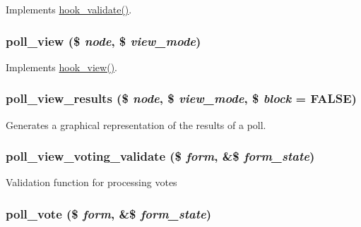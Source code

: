 \label{poll_8module_a42c8123c32a91678ef00d3f09be16a3e}
Implements \hyperlink{group__node__api__hooks_gacaf7cff104c642c28f76ce7ec5f33f40}{hook\_\-validate()}. \hypertarget{poll_8module_a00b8e97faf78018321120f381270c90a}{
\subsubsection[{poll\_\-view}]{\setlength{\rightskip}{0pt plus 5cm}poll\_\-view (\$ {\em node}, \/  \$ {\em view\_\-mode})}}
\label{poll_8module_a00b8e97faf78018321120f381270c90a}
Implements \hyperlink{group__node__api__hooks_gab1f229603b5e0f2f9d9e2a3ab53dcbda}{hook\_\-view()}. \hypertarget{poll_8module_a6ad9f596a691216178d2686e6e73ee85}{
\subsubsection[{poll\_\-view\_\-results}]{\setlength{\rightskip}{0pt plus 5cm}poll\_\-view\_\-results (\$ {\em node}, \/  \$ {\em view\_\-mode}, \/  \$ {\em block} = {\ttfamily FALSE})}}
\label{poll_8module_a6ad9f596a691216178d2686e6e73ee85}
Generates a graphical representation of the results of a poll. \hypertarget{poll_8module_ab78955289cb1d2d7cd2b81f5df302cf2}{
\subsubsection[{poll\_\-view\_\-voting\_\-validate}]{\setlength{\rightskip}{0pt plus 5cm}poll\_\-view\_\-voting\_\-validate (\$ {\em form}, \/  \&\$ {\em form\_\-state})}}
\label{poll_8module_ab78955289cb1d2d7cd2b81f5df302cf2}
Validation function for processing votes \hypertarget{poll_8module_a93d35efa34833d1b825d657bc5f26195}{
\subsubsection[{poll\_\-vote}]{\setlength{\rightskip}{0pt plus 5cm}poll\_\-vote (\$ {\em form}, \/  \&\$ {\em form\_\-state})}}
